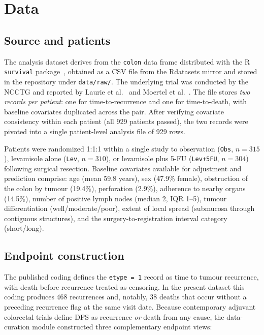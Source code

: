 \section{Data}\label{sec:data}

\subsection{Source and patients}

The analysis dataset derives from the \texttt{colon} data frame
distributed with the R \texttt{survival} package~\cite{therneau2026},
obtained as a CSV file from the Rdatasets mirror and stored in the
repository under \texttt{data/raw/}. The underlying trial was conducted by
the NCCTG and reported by Laurie et al.~\cite{laurie1989} and Moertel et
al.~\cite{moertel1990}. The file stores \emph{two records per patient}: one
for time-to-recurrence and one for time-to-death, with baseline covariates
duplicated across the pair. After verifying covariate consistency within
each patient (all 929 patients passed), the two records were pivoted into a
single patient-level analysis file of 929 rows.

Patients were randomized 1:1:1 within a single study to observation
(\texttt{Obs}, $n=315$), levamisole alone (\texttt{Lev}, $n=310$), or
levamisole plus 5-FU (\texttt{Lev+5FU}, $n=304$) following surgical
resection. Baseline covariates available for adjustment and prediction
comprise: age (mean 59.8 years), sex (47.9\% female), obstruction of the
colon by tumour (19.4\%), perforation (2.9\%), adherence to nearby organs
(14.5\%), number of positive lymph nodes (median 2, IQR 1--5), tumour
differentiation (well/moderate/poor), extent of local spread (submucosa
through contiguous structures), and the surgery-to-registration interval
category (short/long).

\subsection{Endpoint construction}\label{sec:endpoints}

The published coding defines the \texttt{etype = 1} record as time to
tumour recurrence, with death before recurrence treated as censoring. In
the present dataset this coding produces 468 recurrences and, notably, 38
deaths that occur without a preceding recurrence flag at the same visit
date. Because contemporary adjuvant colorectal trials define DFS as
recurrence \emph{or} death from any cause, the data-curation module
constructed three complementary endpoint views:

